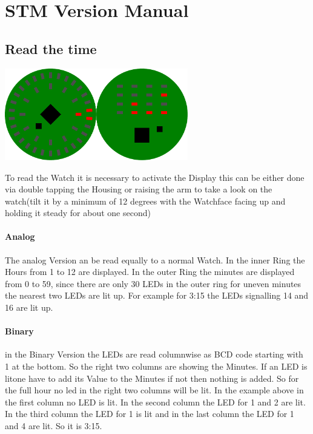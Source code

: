 \section{STM Version Manual}
\subsection{Read the time}
\begin{center}
\includegraphics[width=0.6\textwidth]{../Graphics/Time3_15}
\end{center}
To read the Watch it is necessary to activate the Display this can be either done via double tapping the Housing or raising the arm to take a look on the watch(tilt it by a minimum of 12 degrees with the Watchface facing up and holding it steady for about one second)

\paragraph{Analog}
The analog Version an be read equally to a normal Watch. 
In the inner Ring the Hours from 1 to 12 are displayed. 
In the outer Ring the minutes are displayed from 0 to 59, 
since there are only 30 LEDs in the outer ring for uneven minutes the nearest two LEDs are lit up. 
For example for 3:15 the LEDs signalling 14 and 16 are lit up.

\paragraph{Binary}
in the Binary Version the LEDs are read columnwise as BCD code starting with 1 at the bottom. So the right two columns are showing the Minutes. If an LED is litone have to add its Value to the Minutes if not then nothing is added. So for the full hour no led in the right two columns will be lit.
In the example above in the first column no LED is lit. In the second column the LED for 1 and 2 are lit. In the third column the LED for 1 is lit and in the last column the LED for 1 and 4 are lit.
So it is 3:15.
